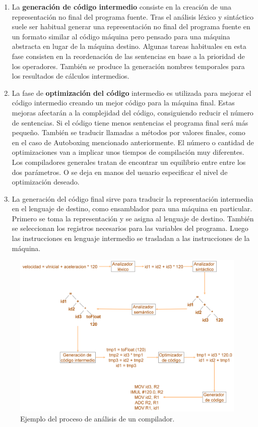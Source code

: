 \begin{enumerate}
    \item La \textbf{generación de código intermedio} consiste en la creación de una representación no final del programa fuente. Tras el análisis léxico y sintáctico suele ser habitual generar una representación no final del programa fuente en un formato similar al código máquina pero pensado para una máquina abstracta en lugar de la máquina destino. Algunas tareas habituales en esta fase consisten en la reordenación de las sentencias en base a la prioridad de los operadores. También se produce la generación nombres temporales para los resultados de cálculos intermedios.
    
    \item La fase de \textbf{optimización del código} intermedio es utilizada para mejorar el código intermedio creando un mejor código para la máquina final. Estas mejoras afectarán a la complejidad del código, consiguiendo reducir el número de sentencias. Si el código tiene menos sentencias el programa final será más pequeño. También se traducir llamadas a métodos por valores finales, como en el caso de Autoboxing mencionado anteriormente. El número o cantidad de optimizaciones van a implicar unos tiempos de compilación muy diferentes. Los compiladores generales tratan de encontrar un equilibrio entre entre los dos parámetros. O se deja en manos del usuario especificar el nivel de optimización deseado.
    
    \item La generación del código final sirve para traducir la representación intermedia en el lenguaje de destino, como ensamblador para una máquina en particular. Primero se toma la representación y se asigna al lenguaje de destino. También se seleccionan los registros necesarios para las variables del programa. Luego las instrucciones en lenguaje intermedio se trasladan a las instrucciones de la máquina.

\end{enumerate}

\begin{figure}[hp!]
    \centering
    \includegraphics[width=1.0\textwidth]{imaxes/c-bases-teoricas/analisis-lexico-sintactico.png}
    \caption{Ejemplo del proceso de análisis de un compilador.}
    \label{fig:analisis-lexico-sintáctico}
\end{figure}
